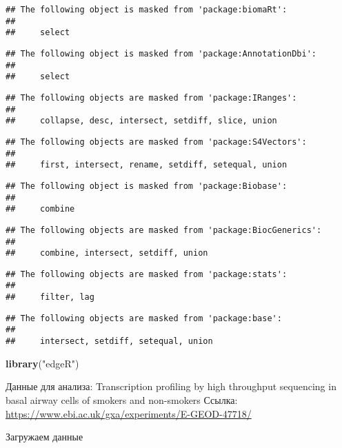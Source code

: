 \documentclass[
]{article}
\newenvironment{Shaded}{\begin{snugshade}}{\end{snugshade}}
\newcommand{\KeywordTok}[1]{\textcolor[rgb]{0.13,0.29,0.53}{\textbf{#1}}}
\newcommand{\NormalTok}[1]{#1}
\newcommand{\StringTok}[1]{\textcolor[rgb]{0.31,0.60,0.02}{#1}}
\begin{document}
\begin{verbatim}
## The following object is masked from 'package:biomaRt':
## 
##     select
\end{verbatim}

\begin{verbatim}
## The following object is masked from 'package:AnnotationDbi':
## 
##     select
\end{verbatim}

\begin{verbatim}
## The following objects are masked from 'package:IRanges':
## 
##     collapse, desc, intersect, setdiff, slice, union
\end{verbatim}

\begin{verbatim}
## The following objects are masked from 'package:S4Vectors':
## 
##     first, intersect, rename, setdiff, setequal, union
\end{verbatim}

\begin{verbatim}
## The following object is masked from 'package:Biobase':
## 
##     combine
\end{verbatim}

\begin{verbatim}
## The following objects are masked from 'package:BiocGenerics':
## 
##     combine, intersect, setdiff, union
\end{verbatim}

\begin{verbatim}
## The following objects are masked from 'package:stats':
## 
##     filter, lag
\end{verbatim}

\begin{verbatim}
## The following objects are masked from 'package:base':
## 
##     intersect, setdiff, setequal, union
\end{verbatim}

\begin{Shaded}
\begin{Highlighting}[]
\KeywordTok{library}\NormalTok{(}\StringTok{"edgeR"}\NormalTok{)}
\end{Highlighting}
\end{Shaded}

Данные для анализа: Transcription profiling by high throughput
sequencing in basal airway cells of smokers and non-smokers Ссылка:
\url{https://www.ebi.ac.uk/gxa/experiments/E-GEOD-47718/}

Загружаем данные
\end{document}
